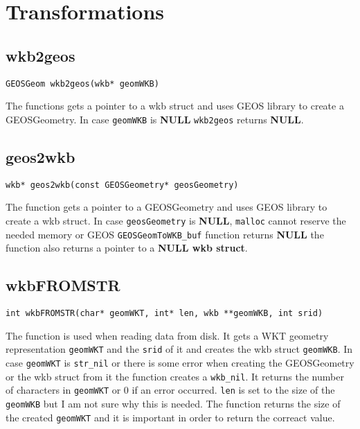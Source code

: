 \documentclass{article}
\begin{document}
\tableofcontents

\section{Transformations}

\subsection{wkb2geos}

{\tt GEOSGeom wkb2geos(wkb* geomWKB) }

\vspace{10pt}

\noindent
The functions gets a pointer to a wkb struct and uses GEOS library to create a 
GEOSGeometry. In case {\tt geomWKB} is {\bf NULL} {\tt wkb2geos} returns {\bf NULL}.


\subsection{geos2wkb}

{\tt wkb* geos2wkb(const GEOSGeometry* geosGeometry)}

\vspace{10pt}

\noindent
The function gets a pointer to a GEOSGeometry and uses GEOS library to create a wkb struct.
In case {\tt geosGeometry} is {\bf NULL}, {\tt malloc} cannot reserve the needed memory 
or GEOS {\tt GEOSGeomToWKB\_buf} function returns {\bf NULL} the function also returns a pointer
to a {\bf NULL wkb struct}. 


\subsection{wkbFROMSTR}

{\tt int wkbFROMSTR(char* geomWKT, int* len, wkb **geomWKB, int srid)}

\vspace{10pt}

\noindent
The function is used when reading data from disk. It gets a WKT geometry representation 
{\tt geomWKT} and the {\tt srid} of it and creates the wkb struct {\tt geomWKB}. In case 
{\tt geomWKT} is {\tt str\_nil} or there is some error when creating the GEOSGeometry or 
the wkb struct from it the function creates a {\tt wkb\_nil}. It returns the number of 
characters in {\tt geomWKT} or 0 if an error occurred. {\tt *len} is set to the size of the  
{\tt geomWKB} but I am not sure why this is needed. The function returns the size of the created 
{\tt geomWKT} and it is important in order to return the correact value.
\end{document}
